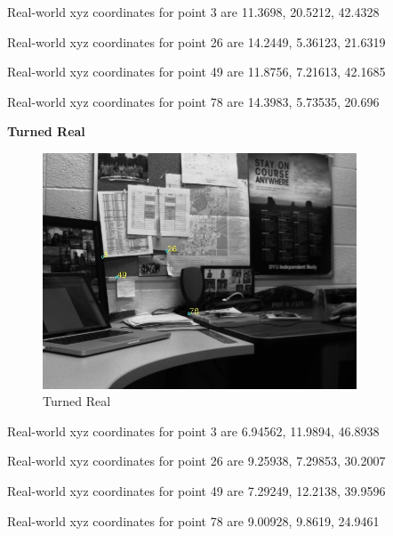 \documentclass[10pt,a4paper]{article}
\begin{document}
Real-world xyz coordinates for point 3 are 11.3698, 20.5212, 42.4328

Real-world xyz coordinates for point 26 are 14.2449, 5.36123, 21.6319

Real-world xyz coordinates for point 49 are 11.8756, 7.21613, 42.1685

Real-world xyz coordinates for point 78 are 14.3983, 5.73535, 20.696

\textbf{Turned Real}

\begin{figure}[H]
\centering
\includegraphics[height=7cm,keepaspectratio]{turnReal_3dinfo}
\caption{Turned Real}
\end{figure}

Real-world xyz coordinates for point 3 are 6.94562, 11.9894, 46.8938

Real-world xyz coordinates for point 26 are 9.25938, 7.29853, 30.2007

Real-world xyz coordinates for point 49 are 7.29249, 12.2138, 39.9596

Real-world xyz coordinates for point 78 are 9.00928, 9.8619, 24.9461
\end{document}
